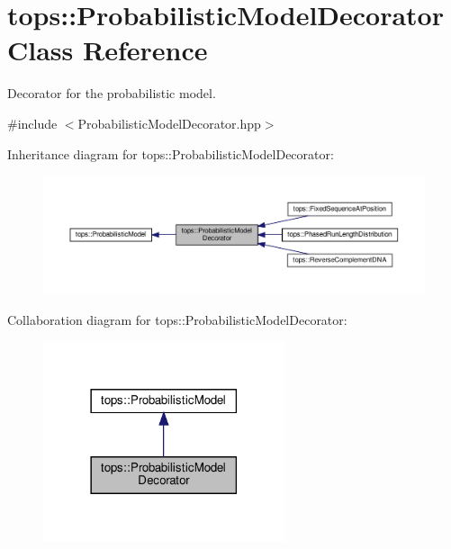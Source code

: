 \hypertarget{classtops_1_1ProbabilisticModelDecorator}{}\section{tops\+:\+:Probabilistic\+Model\+Decorator Class Reference}
\label{classtops_1_1ProbabilisticModelDecorator}


Decorator for the probabilistic model.  




{\ttfamily \#include $<$Probabilistic\+Model\+Decorator.\+hpp$>$}



Inheritance diagram for tops\+:\+:Probabilistic\+Model\+Decorator\+:
\nopagebreak
\begin{figure}[H]
\begin{center}
\leavevmode
\includegraphics[width=350pt]{classtops_1_1ProbabilisticModelDecorator__inherit__graph}
\end{center}
\end{figure}


Collaboration diagram for tops\+:\+:Probabilistic\+Model\+Decorator\+:
\nopagebreak
\begin{figure}[H]
\begin{center}
\leavevmode
\includegraphics[width=201pt]{classtops_1_1ProbabilisticModelDecorator__coll__graph}
\end{center}
\end{figure}
